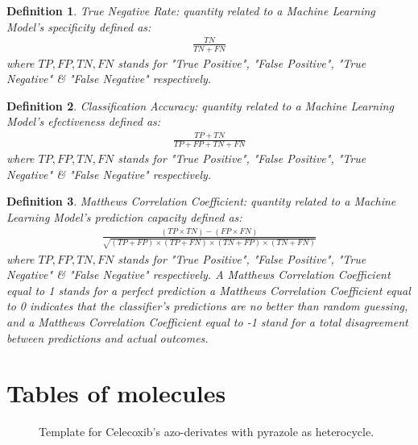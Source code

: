 \documentclass[12pt,letterpaper]{article}
\newtheorem{definition}{Definition}
\begin{document}
\begin{multicols}{2}
\begin{definition}\label{definitionTrueNegativeRate}
True Negative Rate: quantity related to a Machine Learning Model's specificity defined as:
\begin{align}
\frac{TN}{TN+FN}
\end{align}
where $TP,FP,TN,FN$ stands for "True Positive", "False Positive", "True Negative" \& "False Negative" respectively.
\end{definition}

\begin{definition}\label{definitionClassificationAccuracy}
Classification Accuracy: quantity related to a Machine Learning Model's efectiveness defined as:
\begin{align}
\frac{TP+TN}{TP+FP+TN+FN}
\end{align}
where $TP,FP,TN,FN$ stands for "True Positive", "False Positive", "True Negative" \& "False Negative" respectively.
\end{definition}

\begin{definition}\label{definitionMatthewsCorrelationCoeficient}
Matthews Correlation Coefficient: quantity related to a Machine Learning Model's prediction capacity defined as:
{\scriptsize
\begin{align}
\frac{(TP\times TN)-(FP\times FN)}{\sqrt{(TP+FP)\times(TP+FN)\times(TN+FP)\times(TN+FN)}}
\end{align}
}where $TP,FP,TN,FN$ stands for "True Positive", "False Positive", "True Negative" \& "False Negative" respectively.
A Matthews Correlation Coefficient equal to 1 stands for a perfect prediction a Matthews Correlation Coefficient equal to 0 indicates that the classifier’s predictions are no better than random guessing, and a Matthews Correlation Coefficient equal to -1 stand for a total disagreement between predictions and actual outcomes.
\end{definition}

\section{Tables of molecules}
\begin{figure}[H]
\centering
{}
\caption{Template for Celecoxib's azo-derivates with pyrazole as heterocycle.}
\label{figureCelecoxibPyrazole}
\end{figure}


\end{multicols}
\end{document}
